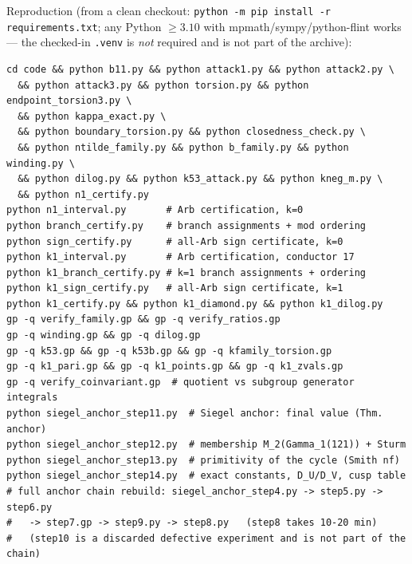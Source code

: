 \documentclass[11pt]{amsart}
\theoremstyle{definition}
\theoremstyle{remark}
\begin{document}
Reproduction (from a clean checkout:
\texttt{python -m pip install -r requirements.txt}; any Python $\ge3.10$
with mpmath/sympy/python-flint works --- the checked-in \texttt{.venv} is
\emph{not} required and is not part of the archive):
{\footnotesize
\begin{verbatim}
cd code && python b11.py && python attack1.py && python attack2.py \
  && python attack3.py && python torsion.py && python endpoint_torsion3.py \
  && python kappa_exact.py \
  && python boundary_torsion.py && python closedness_check.py \
  && python ntilde_family.py && python b_family.py && python winding.py \
  && python dilog.py && python k53_attack.py && python kneg_m.py \
  && python n1_certify.py
python n1_interval.py       # Arb certification, k=0
python branch_certify.py    # branch assignments + mod ordering
python sign_certify.py      # all-Arb sign certificate, k=0
python k1_interval.py       # Arb certification, conductor 17
python k1_branch_certify.py # k=1 branch assignments + ordering
python k1_sign_certify.py   # all-Arb sign certificate, k=1
python k1_certify.py && python k1_diamond.py && python k1_dilog.py
gp -q verify_family.gp && gp -q verify_ratios.gp
gp -q winding.gp && gp -q dilog.gp
gp -q k53.gp && gp -q k53b.gp && gp -q kfamily_torsion.gp
gp -q k1_pari.gp && gp -q k1_points.gp && gp -q k1_zvals.gp
gp -q verify_coinvariant.gp  # quotient vs subgroup generator integrals
python siegel_anchor_step11.py  # Siegel anchor: final value (Thm. anchor)
python siegel_anchor_step12.py  # membership M_2(Gamma_1(121)) + Sturm
python siegel_anchor_step13.py  # primitivity of the cycle (Smith nf)
python siegel_anchor_step14.py  # exact constants, D_U/D_V, cusp table
# full anchor chain rebuild: siegel_anchor_step4.py -> step5.py -> step6.py
#   -> step7.gp -> step9.py -> step8.py   (step8 takes 10-20 min)
#   (step10 is a discarded defective experiment and is not part of the chain)
\end{verbatim}
}
\end{document}

